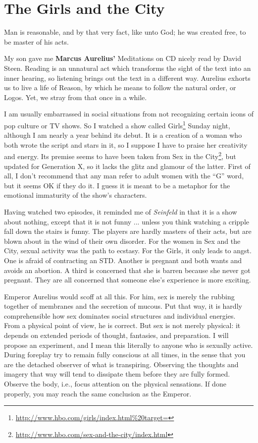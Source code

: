 \section{The Girls and the City}

\begin{quotex}
Man is reasonable, and by that very fact, like unto God; he was created free, to be master of his acts.
\end{quotex}

My son gave me \textbf{Marcus Aurelius'} Meditations on CD nicely read by David Steen. Reading is an unnatural act which transforms the sight of the text into an inner hearing, so listening brings out the text in a different way. Aurelius exhorts us to live a life of Reason, by which he means to follow the natural order, or Logos. Yet, we stray from that once in a while.

I am usually embarrassed in social situations from not recognizing certain icons of pop culture or TV shows. So I watched a show called Girls\footnote{\url{http://www.hbo.com/girls/index.html\%20target=}} Sunday night, although I am nearly a year behind its debut. It is a creation of a woman who both wrote the script and stars in it, so I suppose I have to praise her creativity and energy. Its premise seems to have been taken from Sex in the City\footnote{\url{http://www.hbo.com/sex-and-the-city/index.html}}, but updated for Generation X, so it lacks the glitz and glamour of the latter. First of all, I don't recommend that any man refer to adult women with the ``G'' word, but it seems OK if they do it. I guess it is meant to be a metaphor for the emotional immaturity of the show's characters.

Having watched two episodes, it reminded me of \emph{Seinfeld} in that it is a show about nothing, except that it is not funny ... unless you think watching a cripple fall down the stairs is funny. The players are hardly masters of their acts, but are blown about in the wind of their own disorder. For the women in Sex and the City, sexual activity was the path to ecstasy. For the Girls, it only leads to angst. One is afraid of contracting an STD. Another is pregnant and both wants and avoids an abortion. A third is concerned that she is barren because she never got pregnant. They are all concerned that someone else's experience is more exciting.

Emperor Aurelius would scoff at all this. For him, sex is merely the rubbing together of membranes and the secretion of mucous. Put that way, it is hardly comprehensible how sex dominates social structures and individual energies. From a physical point of view, he is correct. But sex is not merely physical: it depends on extended periods of thought, fantasies, and preparation. I will propose an experiment, and I mean this literally to anyone who is sexually active. During foreplay try to remain fully conscious at all times, in the sense that you are the detached observer of what is transpiring. Observing the thoughts and imagery that way will tend to dissipate them before they are fully formed. Observe the body, i.e., focus attention on the physical sensations. If done properly, you may reach the same conclusion as the Emperor.

